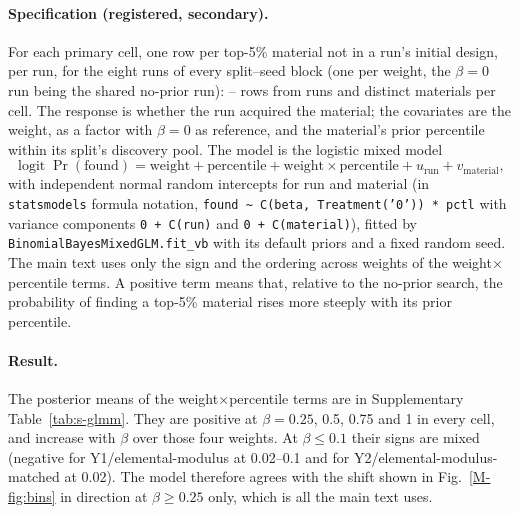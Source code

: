 \documentclass[11pt,a4paper]{article}
\newcommand{\cellB}{Y1/elemental-modulus}
\newcommand{\cellF}{Y2/elemental-modulus-matched}
\begin{document}
\paragraph{Specification (registered, secondary).} For each primary cell, one row per top-5\% material not in a run's initial
design, per run, for the eight runs of every split--seed block (one per weight, the $\beta=0$ run being the shared no-prior run):
-- rows from  runs and
 distinct materials per cell. The response is whether the run acquired the material; the
covariates are the weight, as a factor with $\beta=0$ as reference, and the material's prior percentile within its split's
discovery pool. The model is the logistic mixed model
\[
\operatorname{logit}\Pr(\text{found}) = \text{weight} + \text{percentile} + \text{weight}\times\text{percentile}
 + u_{\text{run}} + v_{\text{material}},
\]
with independent normal random intercepts for run and material (in \texttt{statsmodels} formula notation,
\texttt{found \textasciitilde{} C(beta, Treatment('0')) * pctl} with variance components \texttt{0 + C(run)} and
\texttt{0 + C(material)}), fitted by \texttt{BinomialBayesMixedGLM.fit\_vb} with its default priors and a fixed random seed.
The main text uses only the sign and the ordering across weights of the weight$\times$percentile terms. A positive
term means that, relative to the no-prior search, the probability of finding a top-5\% material rises more steeply with its prior
percentile.

\paragraph{Result.} The posterior means of the weight$\times$percentile terms are in Supplementary Table~\ref{tab:s-glmm}. They
are positive at $\beta=0.25$, 0.5, 0.75 and 1 in every cell, and increase with $\beta$ over those four weights. At
$\beta\le0.1$ their signs are mixed (negative for \cellB{} at 0.02--0.1 and for \cellF{} at 0.02). The model therefore agrees with
the shift shown in Fig.~\ref{M-fig:bins} in direction at $\beta\ge0.25$ only, which is all the main text uses.
\end{document}
